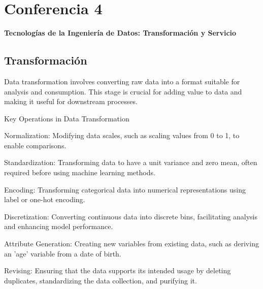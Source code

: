 \documentclass[12pt]{book}
\begin{document}



\chapter{Conferencia 4}
\normalfont\LARGE \textbf{Tecnologías de la Ingeniería de Datos: Transformación y Servicio}
\normalfont\small\\

\section{Transformación}
Data transformation involves converting raw data into a format suitable for analysis and consumption. This stage is crucial for adding value to data and making it useful for downstream processes.

Key Operations in Data Transformation

Normalization: Modifying data scales, such as scaling values from 0 to 1, to enable comparisons.

Standardization: Transforming data to have a unit variance and zero mean, often required before using machine learning methods.

Encoding: Transforming categorical data into numerical representations using label or one-hot encoding.

Discretization: Converting continuous data into discrete bins, facilitating analysis and enhancing model performance.

Attribute Generation: Creating new variables from existing data, such as deriving an 'age' variable from a date of birth.

Revising: Ensuring that the data supports its intended usage by deleting duplicates, standardizing the data collection, and purifying it.
\end{document}
